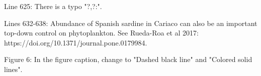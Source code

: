 \documentclass[12pt,english]{reviewresponse}
\begin{document}
\begin{revcomment}
Line 625: There is a typo "?,?:".
\end{revcomment}
\begin{revresponse}
\end{revresponse}

\begin{revcomment}
Lines 632-638: Abundance of Spanish sardine in Cariaco can also be an important top-down control on phytoplankton. See Rueda-Roa et al 2017: https://doi.org/10.1371/journal.pone.0179984.
\end{revcomment}
\begin{revresponse}
\end{revresponse}

\begin{revcomment}
Figure 6: In the figure caption, change to "Dashed black line" and "Colored solid lines".
\end{revcomment}
\begin{revresponse}
\end{revresponse}
\end{document}
